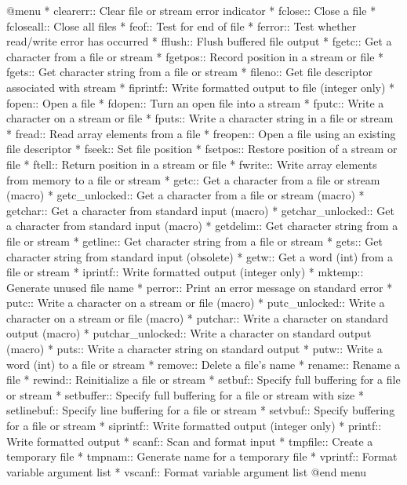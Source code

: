 @menu  
* clearerr::    Clear file or stream error indicator
* fclose::      Close a file
* fcloseall::   Close all files
* feof::        Test for end of file
* ferror::      Test whether read/write error has occurred
* fflush::      Flush buffered file output
* fgetc::       Get a character from a file or stream
* fgetpos::     Record position in a stream or file
* fgets::       Get character string from a file or stream
* fileno::      Get file descriptor associated with stream
* fiprintf::    Write formatted output to file (integer only)
* fopen::       Open a file
* fdopen::	Turn an open file into a stream
* fputc::       Write a character on a stream or file
* fputs::       Write a character string in a file or stream
* fread::       Read array elements from a file
* freopen::     Open a file using an existing file descriptor
* fseek::       Set file position
* fsetpos::     Restore position of a stream or file
* ftell::       Return position in a stream or file
* fwrite::      Write array elements from memory to a file or stream
* getc::        Get a character from a file or stream (macro)
* getc_unlocked::	Get a character from a file or stream (macro)
* getchar::     Get a character from standard input (macro)
* getchar_unlocked::	Get a character from standard input (macro)
* getdelim::    Get character string from a file or stream
* getline::     Get character string from a file or stream
* gets::        Get character string from standard input (obsolete)
* getw::        Get a word (int) from a file or stream
* iprintf::     Write formatted output (integer only)
* mktemp::      Generate unused file name
* perror::      Print an error message on standard error
* putc::        Write a character on a stream or file (macro)
* putc_unlocked::	Write a character on a stream or file (macro)
* putchar::     Write a character on standard output (macro)
* putchar_unlocked::	Write a character on standard output (macro)
* puts::        Write a character string on standard output
* putw::        Write a word (int) to a file or stream
* remove::      Delete a file's name
* rename::      Rename a file
* rewind::      Reinitialize a file or stream
* setbuf::      Specify full buffering for a file or stream
* setbuffer::   Specify full buffering for a file or stream with size
* setlinebuf::  Specify line buffering for a file or stream
* setvbuf::     Specify buffering for a file or stream
* siprintf::    Write formatted output (integer only)
* printf::      Write formatted output
* scanf::       Scan and format input
* tmpfile::     Create a temporary file
* tmpnam::      Generate name for a temporary file
* vprintf::     Format variable argument list
* vscanf::      Format variable argument list
@end menu 


